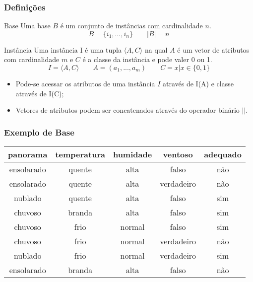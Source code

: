 \begin{frame}
    \frametitle{Definições}
    
    \begin{block}{Base}
        Uma base $B$ é um conjunto de instâncias com cardinalidade $n$.
        \[
            B = \{i_1, ..., i_n\} \qquad |B| = n
        \]
    \end{block}

    \begin{block}{Instância}
        Uma instância I é uma tupla $\langle A, C \rangle$ na qual $A$ é um vetor de atributos com cardinalidade $m$ e $C$ é a classe da instância e pode valer 0 ou 1.
        \[
            I = \langle A, C \rangle \qquad A = (a_1, ..., a_m) \qquad C = x | x \in \{0, 1\}
        \]
    \end{block}

    \begin{itemize}
        \item Pode-se acessar os atributos de uma instância $I$ através de I(A) e classe através de I(C);
        \item Vetores de atributos podem ser concatenados através do operador binário $||$.
    \end{itemize}
\end{frame}

\begin{frame}
    \frametitle{Exemplo de Base}

    \begin{table}
        \centering
        \begin{tabular}{ccccc}
            \hline
            panorama & temperatura & humidade & ventoso & adequado \\
            \hline
            ensolarado & quente & alta & falso & não \\
            ensolarado & quente & alta & verdadeiro & não \\
            nublado & quente & alta & falso & sim \\
            chuvoso & branda & alta & falso & sim \\
            chuvoso & frio & normal & falso & sim \\
            chuvoso & frio & normal & verdadeiro & não \\
            nublado & frio & normal & verdadeiro & sim \\
            ensolarado & branda & alta & falso & não \\
            \hline
        \end{tabular}
    \end{table}
\end{frame}

